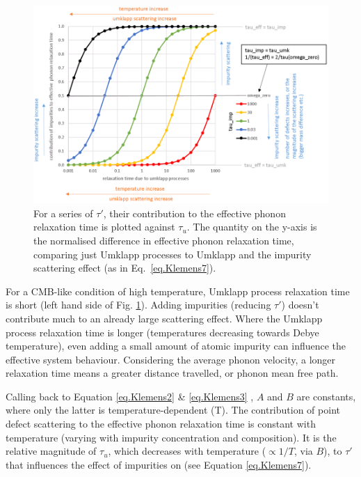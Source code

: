 \begin{figure}[h!]
  \includegraphics[width=\linewidth]{Figures/effective-phonon-relaxation-time.png}
  \caption[CONTENTS BIT]{For a series of ${\tau}'$, their contribution to the effective phonon relaxation time is plotted against $\tau_{u}$. The quantity on the y-axis is the normalised difference in effective phonon relaxation time, comparing just Umklapp processes to Umklapp and the impurity scattering effect (as in Eq.~\ref{eq.Klemens7}). }
  \label{fig:relaxation_time}
\end{figure}

For a CMB-like condition of high temperature, Umklapp process relaxation time is short (left hand side of Fig. \ref{fig:relaxation_time}). Adding impurities (reducing ${\tau}'$) doesn't contribute much to an already large scattering effect. Where the Umklapp process relaxation time is longer (temperatures decreasing towards Debye temperature), even adding a small amount of atomic impurity can influence the effective system behaviour. Considering the average phonon velocity, a longer relaxation time means a greater distance travelled, or phonon mean free path.

Calling back to Equation \ref{eq.Klemens2} \& \ref{eq.Klemens3} , $A$ and $B$ are constants, where only the latter is temperature-dependent (T). The contribution of point defect scattering to the effective phonon relaxation time is constant with temperature (varying with impurity concentration and composition). It is the relative magnitude of $\tau_{u}$, which decreases with temperature ($\propto 1/T$, via $B$), to ${\tau}'$ that influences the effect of impurities on \tcs (see Equation \ref{eq.Klemens7}).
 
